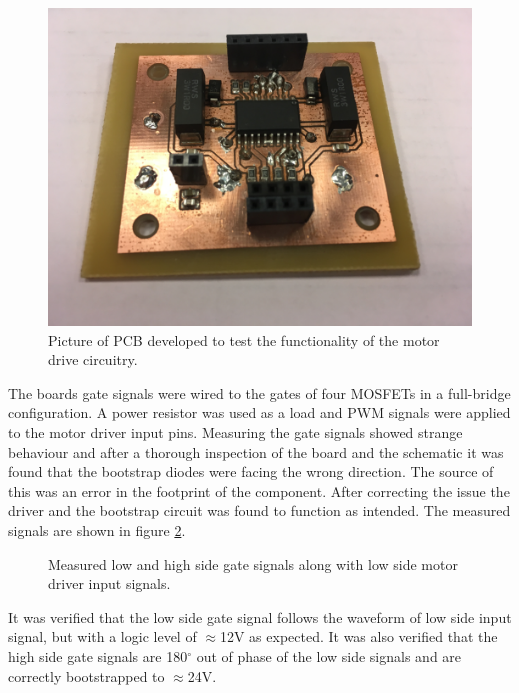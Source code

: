 \begin{figure}
	\centering
	\includegraphics[width=0.5\linewidth]{graphics/hipboard_pic}
	\caption[Prototype PCB with motor driver.]{Picture of PCB developed to test the functionality of the motor drive circuitry.}
	\label{fig:m_drive_circuit}
\end{figure}
The boards gate signals were wired to the gates of four MOSFETs in a full-bridge configuration.
A power resistor was used as a load and PWM signals were applied to the motor driver input pins. 
Measuring the gate signals showed strange behaviour and after a thorough inspection of the board and the schematic it was found that the bootstrap diodes were facing the wrong direction. 
The source of this was an error in the footprint of the component. 
After correcting the issue the driver and the bootstrap circuit was found to function as intended. 
The measured signals are shown in figure \ref{fig:test_hip_signals}.

\begin{figure}[h]
	\centering
    
	\caption[Measured gate and input signals.]{Measured low and high side gate signals along with low side motor driver input signals.}
	\label{fig:test_hip_signals}
\end{figure}
It was verified that the low side gate signal follows the waveform of low side input signal, but with a logic level of $\approx$12V as expected. 
It was also verified that the high side gate signals are 180$^\circ$ out of phase of the low side signals and are correctly bootstrapped to $\approx$24V.

